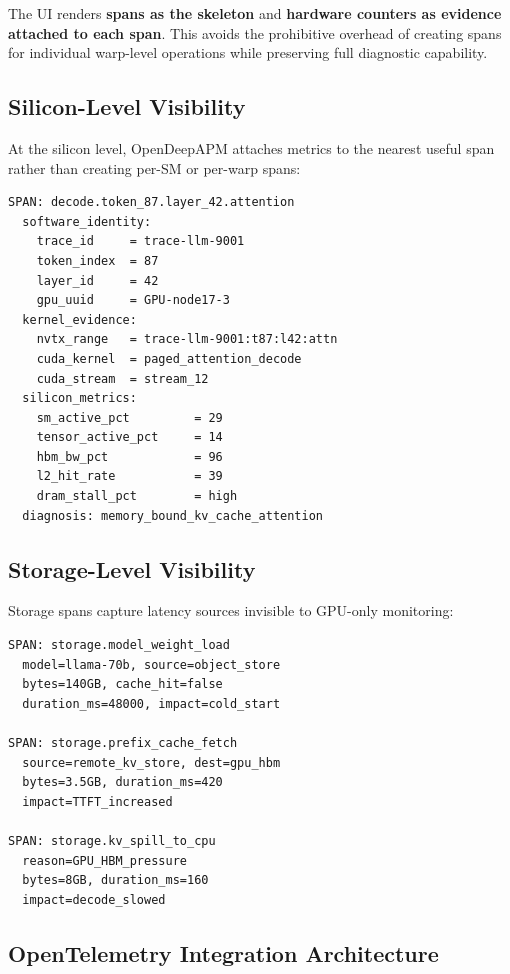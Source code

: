 \documentclass[conference,10pt]{IEEEtran}
\begin{document}
The UI renders \textbf{spans as the skeleton} and \textbf{hardware counters as evidence attached to each span}. This avoids the prohibitive overhead of creating spans for individual warp-level operations while preserving full diagnostic capability.

\subsection{Silicon-Level Visibility}

At the silicon level, OpenDeepAPM attaches metrics to the nearest useful span rather than creating per-SM or per-warp spans:

\begin{lstlisting}
SPAN: decode.token_87.layer_42.attention
  software_identity:
    trace_id     = trace-llm-9001
    token_index  = 87
    layer_id     = 42
    gpu_uuid     = GPU-node17-3
  kernel_evidence:
    nvtx_range   = trace-llm-9001:t87:l42:attn
    cuda_kernel  = paged_attention_decode
    cuda_stream  = stream_12
  silicon_metrics:
    sm_active_pct         = 29
    tensor_active_pct     = 14
    hbm_bw_pct            = 96
    l2_hit_rate           = 39
    dram_stall_pct        = high
  diagnosis: memory_bound_kv_cache_attention
\end{lstlisting}

\subsection{Storage-Level Visibility}

Storage spans capture latency sources invisible to GPU-only monitoring:

\begin{lstlisting}
SPAN: storage.model_weight_load
  model=llama-70b, source=object_store
  bytes=140GB, cache_hit=false
  duration_ms=48000, impact=cold_start

SPAN: storage.prefix_cache_fetch
  source=remote_kv_store, dest=gpu_hbm
  bytes=3.5GB, duration_ms=420
  impact=TTFT_increased

SPAN: storage.kv_spill_to_cpu
  reason=GPU_HBM_pressure
  bytes=8GB, duration_ms=160
  impact=decode_slowed
\end{lstlisting}

\subsection{OpenTelemetry Integration Architecture}
\end{document}
